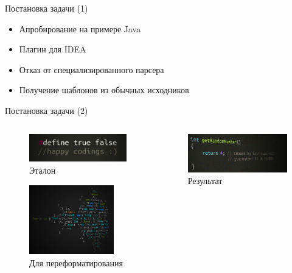 \documentclass[sans]{beamer}
\begin{document}
\begin{frame}{Постановка задачи (1)}
	\begin{itemize}
		\item Апробирование на примере Java
		\item Плагин для IDEA
	\end{itemize}
	\begin{itemize}
		\item Отказ от специализированного парсера
		\item Получение шаблонов из обычных исходников
	\end{itemize}
\end{frame}

\begin{frame}{Постановка задачи (2)}
	\begin{columns}[T]
		\begin{column}{.5\textwidth}
			\begin{figure}
				\includegraphics[width = \linewidth]{images/trueFalse.png}
				\caption{Эталон}
			\end{figure}
			\begin{figure}
				\includegraphics[height = 3cm, width = \linewidth]{images/mandel.png}
				\caption{Для переформатирования}
			\end{figure}
		\end{column}

		\pause

		\begin{column}{.5\textwidth}
		\begin{minipage}[c][0.8\textheight][c]{\linewidth}
			\begin{figure}[c]
				\includegraphics[width = \linewidth]{images/rand.png}
				\caption{Результат}
			\end{figure}
		\end{minipage}
		\end{column}
	\end{columns}
\end{frame}
\end{document}
